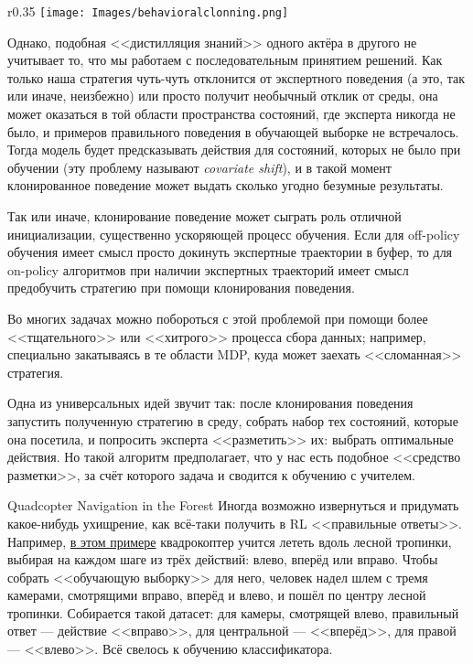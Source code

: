 \begin{wrapfigure}{r}{0.35\textwidth}
\vspace{-0.4cm}
\centering
\texttt{[image: Images/behavioralclonning.png]}
\vspace{-0.5cm}
\end{wrapfigure}

Однако, подобная <<дистилляция знаний>> одного актёра в другого не учитывает то, что мы работаем с последовательным принятием решений. Как только наша стратегия чуть-чуть отклонится от экспертного поведения (а это, так или иначе, неизбежно) или просто получит необычный отклик от среды, она может оказаться в той области пространства состояний, где эксперта никогда не было, и примеров правильного поведения в обучающей выборке не встречалось. Тогда модель будет предсказывать действия для состояний, которых не было при обучении (эту проблему называют \emph{covariate shift}), и в такой момент клонированное поведение может выдать сколько угодно безумные результаты.

\begin{remark}
Так или иначе, клонирование поведение может сыграть роль отличной инициализации, существенно ускоряющей процесс обучения. Если для off-policy обучения имеет смысл просто докинуть экспертные траектории в буфер, то для on-policy алгоритмов при наличии экспертных траекторий имеет смысл предобучить стратегию при помощи клонирования поведения. 
\end{remark}

Во многих задачах можно побороться с этой проблемой при помощи более <<тщательного>> или <<хитрого>> процесса сбора данных; например, специально закатываясь в те области MDP, куда может заехать <<сломанная>> стратегия.

\begin{example}[DAgger]
Одна из универсальных идей звучит так: после клонирования поведения запустить полученную стратегию в среду, собрать набор тех состояний, которые она посетила, и попросить эксперта <<разметить>> их: выбрать оптимальные действия. Но такой алгоритм предполагает, что у нас есть подобное <<средство разметки>>, за счёт которого задача и сводится к обучению с учителем.
\end{example}

\begin{exampleBox}[label=ex:quadrocopter]{Quadcopter Navigation in the Forest}
Иногда возможно извернуться и придумать какое-нибудь ухищрение, как всё-таки получить в RL <<правильные ответы>>. Например, \href{https://www.youtube.com/watch?v=umRdt3zGgpU&ab_channel=AAAIVideoCompetition}{в этом примере} квадрокоптер учится лететь вдоль лесной тропинки, выбирая на каждом шаге из трёх действий: влево, вперёд или вправо. Чтобы собрать <<обучающую выборку>> для него, человек надел шлем с тремя камерами, смотрящими вправо, вперёд и влево, и пошёл по центру лесной тропинки. Собирается такой датасет: для камеры, смотрящей влево, правильный ответ --- действие <<вправо>>, для центральной --- <<вперёд>>, для правой --- <<влево>>. Всё свелось к обучению классификатора.
\end{exampleBox}

